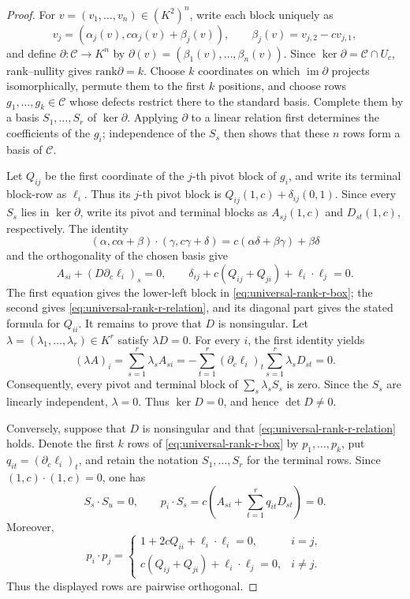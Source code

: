 \documentclass[10pt,a4paper]{amsart}
\newcommand{\rank}{\mathrm{rank}}
\begin{document}
\begin{proof}
For \(v=(v_1,\ldots,v_n)\in(K^2)^n\), write each block uniquely as
\[
 v_j=(\alpha_j(v),c\alpha_j(v)+\beta_j(v)),\qquad
 \beta_j(v)=v_{j,2}-cv_{j,1},
\]
and define \(\partial:\mathcal C\to K^n\) by
\(\partial(v)=(\beta_1(v),\ldots,\beta_n(v))\).  Since
\(\ker\partial=\mathcal C\cap U_c\), rank--nullity gives
\(\rank\partial=k\).  Choose \(k\) coordinates on which
\(\operatorname{im}\partial\) projects isomorphically, permute them to the
first \(k\) positions, and choose rows \(g_1,\ldots,g_k\in\mathcal C\) whose defects
restrict there to the standard basis.  Complete them by a basis
\(S_1,\ldots,S_r\) of \(\ker\partial\).  Applying \(\partial\) to a linear
relation first determines the coefficients of the \(g_i\); independence of
the \(S_s\) then shows that these \(n\) rows form a basis of \(\mathcal C\).

Let \(Q_{ij}\) be the first coordinate of the \(j\)-th pivot block of
\(g_i\), and write its terminal block-row as \(\ell_i\).  Thus its
\(j\)-th pivot block is
\(Q_{ij}(1,c)+\delta_{ij}(0,1)\).  Since every \(S_s\) lies in
\(\ker\partial\), write its pivot and terminal blocks as
\(A_{sj}(1,c)\) and \(D_{st}(1,c)\), respectively.  The identity
\[
 (\alpha,c\alpha+\beta)\cdot(\gamma,c\gamma+\delta)
   =c(\alpha\delta+\beta\gamma)+\beta\delta
\]
and the orthogonality of the chosen basis give
\[
 A_{si}+(D\partial_c\ell_i)_s=0,
\qquad
 \delta_{ij}+c(Q_{ij}+Q_{ji})+\ell_i\cdot\ell_j=0.
\]
The first equation gives the lower-left block in
\eqref{eq:universal-rank-r-box}; the second gives
\eqref{eq:universal-rank-r-relation}, and its diagonal part gives the stated
formula for \(Q_{ii}\).  It remains to prove that \(D\) is nonsingular.
Let \(\lambda=(\lambda_1,\ldots,\lambda_r)\in K^r\) satisfy
\(\lambda D=0\).  For every \(i\), the first identity yields
\[
 (\lambda A)_i
   =\sum_{s=1}^r\lambda_sA_{si}
   =-\sum_{t=1}^r(\partial_c\ell_i)_t
                    \sum_{s=1}^r\lambda_sD_{st}=0.
\]
Consequently, every pivot and terminal block of
\(\sum_s\lambda_sS_s\) is zero.  Since the \(S_s\) are linearly
independent, \(\lambda=0\).  Thus \(\ker D=0\), and hence
\(\det D\ne0\).

Conversely, suppose that \(D\) is nonsingular and that
\eqref{eq:universal-rank-r-relation} holds.  Denote the first \(k\) rows of
\eqref{eq:universal-rank-r-box} by \(p_1,\ldots,p_k\), put
\(q_{it}=(\partial_c\ell_i)_t\), and retain the notation
\(S_1,\ldots,S_r\) for the terminal rows.  Since
\((1,c)\cdot(1,c)=0\), one has
\[
 S_s\cdot S_u=0,
 \qquad
 p_i\cdot S_s
   =c\left(A_{si}+\sum_{t=1}^r q_{it}D_{st}\right)=0.
\]
Moreover,
\[
 p_i\cdot p_j=
 \begin{cases}
  1+2cQ_{ii}+\ell_i\cdot\ell_i=0,&i=j,\\
  c(Q_{ij}+Q_{ji})+\ell_i\cdot\ell_j=0,&i\ne j.
 \end{cases}
\]
Thus the displayed rows are pairwise orthogonal.


\end{proof}
\end{document}
